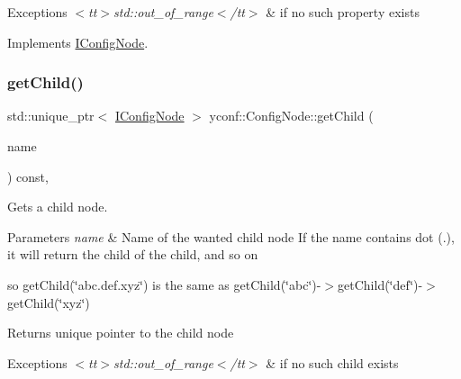 \begin{DoxyExceptions}{Exceptions}
{\em $<$tt$>$std\+::out\+\_\+of\+\_\+range$<$/tt$>$} & if no such property exists \\
\hline
\end{DoxyExceptions}


Implements \hyperlink{classIConfigNode_ae6abd34301fc7141963ef125117db0c5}{I\+Config\+Node}.

\mbox{\label{classyconf_1_1ConfigNode_a419f3e4e042f7cd0746f83d96977d18e}} 
\subsubsection{\texorpdfstring{get\+Child()}{getChild()}}
{\footnotesize\ttfamily std\+::unique\+\_\+ptr$<$ \hyperlink{classIConfigNode}{I\+Config\+Node} $>$ yconf\+::\+Config\+Node\+::get\+Child (\begin{DoxyParamCaption}\item[{const std\+::string \&}]{name }\end{DoxyParamCaption}) const\hspace{0.3cm}{\ttfamily [override]}, {\ttfamily [virtual]}}



Gets a child node. 


\begin{DoxyParams}{Parameters}
{\em name} & Name of the wanted child node If the name contains dot ({\ttfamily .}), it will return the child of the child, and so on\\
\hline
\end{DoxyParams}
so {\ttfamily get\+Child(\char`\"{}abc.\+def.\+xyz\char`\"{})} is the same as {\ttfamily get\+Child(\char`\"{}abc\char`\"{})-\/$>$get\+Child(\char`\"{}def\char`\"{})-\/$>$get\+Child(\char`\"{}xyz\char`\"{})}

\begin{DoxyReturn}{Returns}
unique pointer to the child node 
\end{DoxyReturn}

\begin{DoxyExceptions}{Exceptions}
{\em $<$tt$>$std\+::out\+\_\+of\+\_\+range$<$/tt$>$} & if no such child exists \\
\hline
\end{DoxyExceptions}


